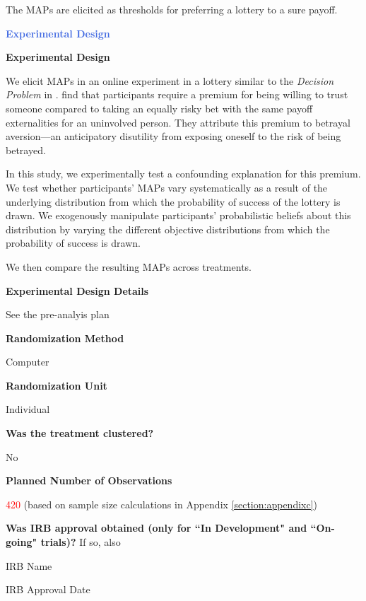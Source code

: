 The MAPs are elicited as thresholds for preferring a lottery to a sure payoff. 



\large \noindent \textcolor{RoyalBlue}{\textbf{Experimental Design}}

\normalsize \noindent \textcolor{NavyBlue}{\textbf{Experimental Design}}

We elicit MAPs in an online experiment in a lottery similar to the \textit{Decision Problem} in \cite{Bohnet2004}.
\cite{Bohnet2004} find that participants require a premium for being willing to trust someone compared to taking an equally risky bet with the same payoff externalities for an uninvolved person.
They attribute this premium to betrayal aversion---an anticipatory disutility from exposing oneself to the risk of being betrayed.

In this study, we experimentally test a confounding explanation for this premium.
We test whether participants' MAPs vary systematically as a result of the underlying distribution from which the probability of success of the lottery is drawn.
We exogenously manipulate participants' probabilistic beliefs about this distribution by varying the different objective distributions from which the probability of success is drawn.

We then compare the resulting MAPs across treatments.

\noindent \textcolor{NavyBlue}{\textbf{Experimental Design Details}}

See the pre-analyis plan

\noindent \textcolor{NavyBlue}{\textbf{Randomization Method}}

Computer

\noindent \textcolor{NavyBlue}{\textbf{Randomization Unit}}

Individual

\noindent \textcolor{NavyBlue}{\textbf{Was the treatment clustered?}}

No

\noindent \textcolor{NavyBlue}{\textbf{Planned Number of Observations}}

\textcolor{red}{420} (based on sample size calculations in Appendix \ref{section:appendixc})
    
\noindent \textcolor{NavyBlue}{\textbf{Was IRB approval obtained (only for ``In Development" and ``On-going" trials)?}} If so, also

        IRB Name
        
        IRB Approval Date
        
